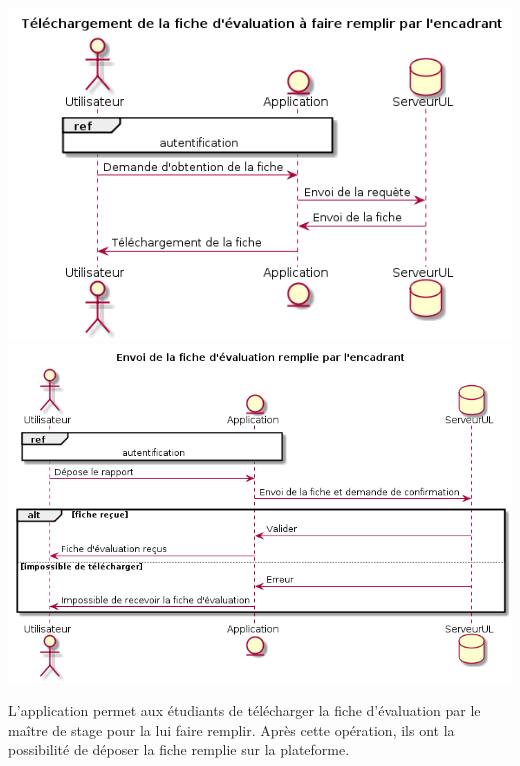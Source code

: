 \documentclass{scrreprt}
\begin{document}
\begin{center}
	\includegraphics[scale=0.55]{image/telechargementFicheEvaluation.png}
	\includegraphics[scale=0.55]{image/envoiFicheEvaluation.png}
\end{center}
\hspace{1cm}L'application permet aux étudiants de télécharger la fiche d'évaluation par le maître de stage pour la lui faire remplir. Après cette opération, ils ont la possibilité de déposer la fiche remplie sur la plateforme.
\end{document}
